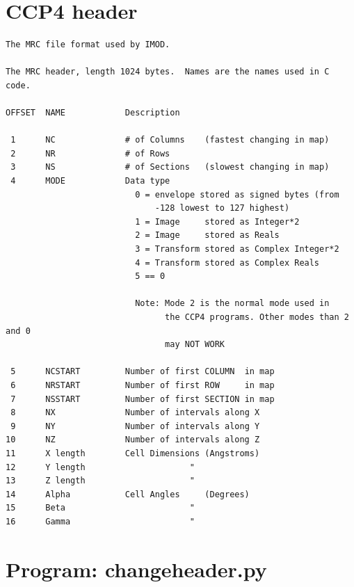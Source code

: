 \documentclass[12pt]{article} %
\begin{document}
\section {CCP4 header}
\label{app:ccp4header}
\begin{verbatim}
The MRC file format used by IMOD.

The MRC header, length 1024 bytes.  Names are the names used in C code.

OFFSET  NAME            Description

 1      NC              # of Columns    (fastest changing in map)
 2      NR              # of Rows
 3      NS              # of Sections   (slowest changing in map)
 4      MODE            Data type
                          0 = envelope stored as signed bytes (from
                              -128 lowest to 127 highest)
                          1 = Image     stored as Integer*2
                          2 = Image     stored as Reals
                          3 = Transform stored as Complex Integer*2
                          4 = Transform stored as Complex Reals
                          5 == 0	
 
                          Note: Mode 2 is the normal mode used in
                                the CCP4 programs. Other modes than 2 and 0
                                may NOT WORK
 
 5      NCSTART         Number of first COLUMN  in map
 6      NRSTART         Number of first ROW     in map
 7      NSSTART         Number of first SECTION in map
 8      NX              Number of intervals along X
 9      NY              Number of intervals along Y
10      NZ              Number of intervals along Z
11      X length        Cell Dimensions (Angstroms)
12      Y length                     "
13      Z length                     "
14      Alpha           Cell Angles     (Degrees)
15      Beta                         "
16      Gamma                        "\end{verbatim}

% 


\section {Program: changeheader.py}
\label{app:changeheader}
\end{document}
